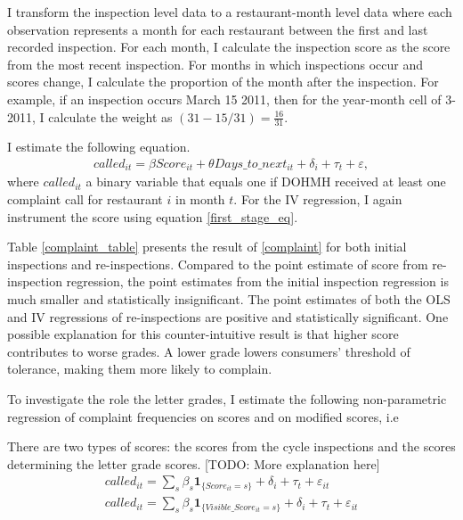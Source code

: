 \documentclass[11pt]{article}
\begin{document}
I transform the inspection level data to a restaurant-month level data where each observation represents a month for each restaurant between the first and last recorded inspection. For each month, I calculate the inspection score as the score from the most recent inspection. For months in which inspections occur and scores change, I calculate the proportion of the month after the inspection. For example, if an inspection occurs March 15 2011, then for the year-month cell of 3-2011, I calculate the weight as $(31-15/31) = \frac{16}{31}$. 

I estimate the following equation.
\begin{align}
\label{complaint}
called_{it} = \beta Score_{it} + \theta Days\_to\_next_{it} + \delta_i + \tau_t + \varepsilon,
\end{align}
where $called_{it}$ a binary variable that equals one if DOHMH received at least one complaint call for restaurant $i$ in month $t$. For the IV regression, I again instrument the score using equation \eqref{first_stage_eq}. 

Table \ref{complaint_table} presents the result of \eqref{complaint} for both initial inspections and re-inspections. Compared to the point estimate of score from re-inspection regression, the point estimates from the initial inspection regression is much smaller and statistically insignificant. The point estimates of both the OLS and IV regressions of re-inspections are positive and statistically significant. One possible explanation for this counter-intuitive result is that higher score contributes to worse grades. A lower grade lowers consumers' threshold of tolerance, making them more likely to complain. 

To investigate the role the letter grades, I estimate the following non-parametric regression of complaint frequencies on scores and on modified scores, i.e

There are two types of scores: the scores from the cycle inspections and the scores determining the letter grade scores. [TODO: More explanation here] 
\begin{subequations}
\begin{align*}
called_{it} = \sum_s \beta_s \textbf{1}_{\{Score_{it} = s\}} + \delta_i + \tau_t + \varepsilon_{it} \\
called_{it} = \sum_s \beta_s \textbf{1}_{\{Visible\_Score_{it} = s\}} + \delta_i + \tau_t + \varepsilon_{it}
\end{align*}
\end{subequations}
\end{document}
